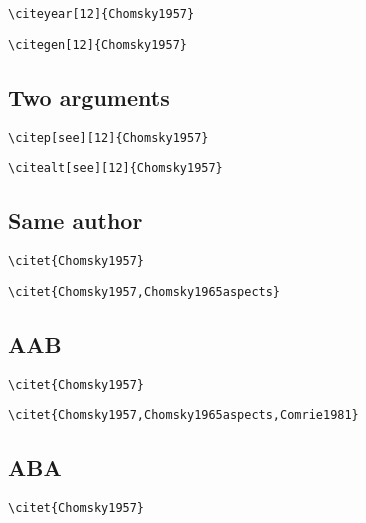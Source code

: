  
 
  


\bigskip
\verb+\citeyear[12]{Chomsky1957}+

   \citeyear[12]{Chomsky1957}          

  

\bigskip
\verb+\citegen[12]{Chomsky1957}+


   

 \subsection{Two arguments}
  


\bigskip
\verb+\citep[see][12]{Chomsky1957}+

       \citep[see][12]{Chomsky1957}            

 


\bigskip
\verb+\citealt[see][12]{Chomsky1957}+

     \citealt[see][12]{Chomsky1957}          

 
 
   
   

 
 
\subsection{Same author}
\bigskip
\verb+\citet{Chomsky1957}+

        \citet{Chomsky1957}            


\bigskip
\verb+\citet{Chomsky1957,Chomsky1965aspects}+

       \citet{Chomsky1957,Chomsky1965aspects} 

 
 
\subsection{AAB}
\bigskip
\verb+\citet{Chomsky1957}+

        \citet{Chomsky1957}            


\bigskip
\verb+\citet{Chomsky1957,Chomsky1965aspects,Comrie1981}+

       \citet{Chomsky1957,Chomsky1965aspects,Comrie1981} 

 
 
\subsection{ABA}
\bigskip
\verb+\citet{Chomsky1957}+

